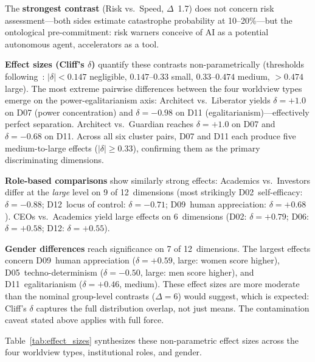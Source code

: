 \documentclass[12pt,a4paper]{article}
\begin{document}
The \textbf{strongest contrast} (Risk vs.\ Speed, $\Delta$~1.7) does not concern risk assessment---both sides estimate catastrophe probability at 10--20\%---but the ontological pre-commitment: risk warners conceive of AI as a potential autonomous agent, accelerators as a tool.

\textbf{Effect sizes (Cliff's $\delta$)} quantify these contrasts non-parametrically (thresholds following~\citealt{Romano2006}: $|\delta| < 0.147$ negligible, $0.147$--$0.33$ small, $0.33$--$0.474$ medium, $> 0.474$ large). The most extreme pairwise differences between the four worldview types emerge on the power-egalitarianism axis: Architect vs.\ Liberator yields $\delta = +1.0$ on D07 (power concentration) and $\delta = -0.98$ on D11 (egalitarianism)---effectively perfect separation. Architect vs.\ Guardian reaches $\delta = +1.0$ on D07 and $\delta = -0.68$ on D11. Across all six cluster pairs, D07 and D11 each produce five medium-to-large effects ($|\delta| \geq 0.33$), confirming them as the primary discriminating dimensions.

\textbf{Role-based comparisons} show similarly strong effects: Academics vs.\ Investors differ at the \emph{large} level on 9 of 12~dimensions (most strikingly D02~self-efficacy: $\delta = -0.88$; D12~locus of control: $\delta = -0.71$; D09~human appreciation: $\delta = +0.68$). CEOs vs.\ Academics yield large effects on 6~dimensions (D02: $\delta = +0.79$; D06: $\delta = +0.58$; D12: $\delta = +0.55$).

\textbf{Gender differences} reach significance on 7 of 12~dimensions. The largest effects concern D09~human appreciation ($\delta = +0.59$, large: women score higher), D05~techno-determinism ($\delta = -0.50$, large: men score higher), and D11~egalitarianism ($\delta = +0.46$, medium). These effect sizes are more moderate than the nominal group-level contrasts ($\Delta = 6$) would suggest, which is expected: Cliff's $\delta$ captures the full distribution overlap, not just means. The contamination caveat stated above applies with full force.

Table~\ref{tab:effect_sizes} synthesizes these non-parametric effect sizes across the four worldview types, institutional roles, and gender.
\end{document}
